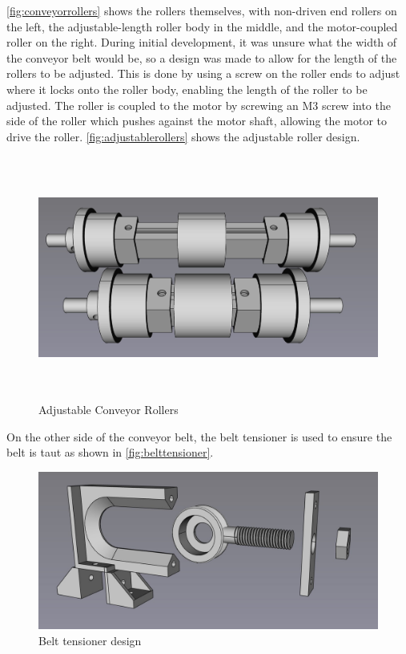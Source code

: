 \autoref{fig:conveyorrollers} shows the rollers themselves, with non-driven end rollers on the left, the adjustable-length roller body in the middle, and the motor-coupled roller on the right. During initial development, it was unsure what the width of the conveyor belt would be, so a design was made to allow for the length of the rollers to be adjusted. This is done by using a screw on the roller ends to adjust where it locks onto the roller body, enabling the length of the roller to be adjusted. The roller is coupled to the motor by screwing an M3 screw into the side of the roller which pushes against the motor shaft, allowing the motor to drive the roller. \autoref{fig:adjustablerollers} shows the adjustable roller design.

\begin{figure}[H]
    \begin{minipage}[h]{\textwidth}
        \centering
        \includegraphics[height=8cm]{imgs/freecad/adjustablerollers.jpg}
        \caption{Adjustable Conveyor Rollers}
        \label{fig:adjustablerollers}
    \end{minipage}
\end{figure}

On the other side of the conveyor belt, the belt tensioner is used to ensure the belt is taut as shown in \autoref{fig:belttensioner}.

\begin{figure}[H]
    \begin{minipage}[h]{0.95\textwidth}
        \centering
        \includegraphics[width=\textwidth]{imgs/freecad/belttensioner.jpg}
        \caption{Belt tensioner design}
        \label{fig:belttensioner}
    \end{minipage}
\end{figure}

